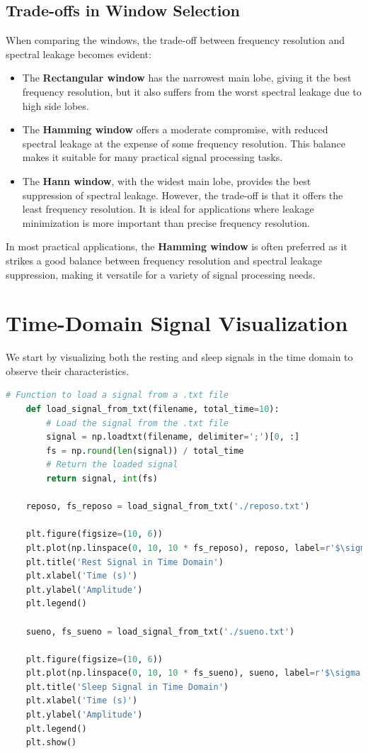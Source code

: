 \documentclass[10pt]{article}
\theoremstyle{definition}
\theoremstyle{remark}
\theoremstyle{definition}
\numberwithin{equation}{prob}
\begin{document}
\subsection{Trade-offs in Window Selection}
When comparing the windows, the trade-off between frequency resolution and spectral leakage becomes evident:

\begin{itemize}
    \item The \textbf{Rectangular window} has the narrowest main lobe, giving it the best frequency resolution, but it also suffers from the worst spectral leakage due to high side lobes.
    
    \item The \textbf{Hamming window} offers a moderate compromise, with reduced spectral leakage at the expense of some frequency resolution. This balance makes it suitable for many practical signal processing tasks.
    
    \item The \textbf{Hann window}, with the widest main lobe, provides the best suppression of spectral leakage. However, the trade-off is that it offers the least frequency resolution. It is ideal for applications where leakage minimization is more important than precise frequency resolution.
\end{itemize}

In most practical applications, the \textbf{Hamming window} is often preferred as it strikes a good balance between frequency resolution and spectral leakage suppression, making it versatile for a variety of signal processing needs.





\section{Time-Domain Signal Visualization}

We start by visualizing both the resting and sleep signals in the time domain to observe their characteristics.

\begin{lstlisting}[language=Python]
	# Function to load a signal from a .txt file
	def load_signal_from_txt(filename, total_time=10):
		# Load the signal from the .txt file
		signal = np.loadtxt(filename, delimiter=';')[0, :]
		fs = np.round(len(signal)) / total_time
		# Return the loaded signal
		return signal, int(fs)

	reposo, fs_reposo = load_signal_from_txt('./reposo.txt')

	plt.figure(figsize=(10, 6))
	plt.plot(np.linspace(0, 10, 10 * fs_reposo), reposo, label=r'$\sigma = 1$')
	plt.title('Rest Signal in Time Domain')
	plt.xlabel('Time (s)')
	plt.ylabel('Amplitude')
	plt.legend()

	sueno, fs_sueno = load_signal_from_txt('./sueno.txt')

	plt.figure(figsize=(10, 6))
	plt.plot(np.linspace(0, 10, 10 * fs_sueno), sueno, label=r'$\sigma = 1$')
	plt.title('Sleep Signal in Time Domain')
	plt.xlabel('Time (s)')
	plt.ylabel('Amplitude')
	plt.legend()
	plt.show()
\end{lstlisting}
\end{document}
